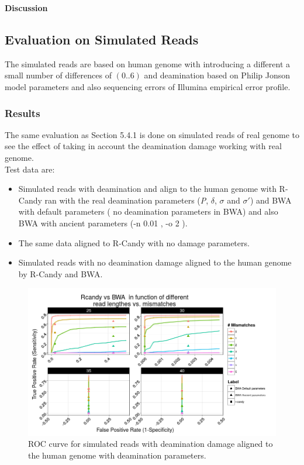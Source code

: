 \documentclass[11pt,a4paper]{report}
\begin{document}
\textbf{Discussion}



\subsection{Evaluation on Simulated Reads} 

The simulated reads are based on human genome 
 with introducing a different a small number of differences of $(0..6)$ and deamination based 
on Philip Jonson model parameters and also sequencing errors of Illumina empirical error profile.\\




\subsubsection{Results} 

The same evaluation as Section 5.4.1 is done on simulated reads of real genome to see the effect of 
taking in account the deamination damage working with real genome. \\
Test data are:
\begin{itemize}

 \item Simulated reads with deamination and align to the human genome with R-Candy ran with 
the real deamination parameters (\emph{P}, $\delta$, $ \sigma $ and $ \sigma\prime $) and BWA with default
parameters ( no deamination parameters in BWA) and also BWA with ancient parameters (-n 0.01 , -o 2 ). 

 \item The same data aligned to R-Candy with no damage parameters. 
 
 \item Simulated reads with no deamination damage aligned to the human genome by R-Candy and BWA. 

\end{itemize}

\begin{figure}[H]
\centering
\includegraphics[width=12cm]{pictures/DS4.png}
\caption{ROC curve for simulated reads with deamination damage aligned to the human genome
         with deamination parameters.}
\label{DS4}
\end{figure}
\end{document}
